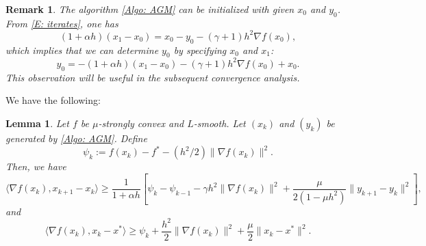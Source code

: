 \documentclass[pdflatex,sn-mathphys-num]{sn-jnl}
\theoremstyle{thmstyleone}
\newtheorem{lemma}[theorem]{Lemma}
\theoremstyle{thmstyletwo}
\newtheorem{remark}{Remark}
\theoremstyle{thmstylethree}
\begin{document}
\begin{remark}\label{Rem: x_0}
The algorithm \eqref{Algo: AGM} can be initialized with given $x_0$ and $y_0$. From \eqref{E: iterates}, one has  
$$ (1+\alpha h)(x_1-x_0) = x_0 - y_0 - (\gamma+1)h^2\nabla f(x_0), $$
which implies that we can determine $y_0$ by specifying $x_0$ and $x_1$:
$$ y_0 = -(1+\alpha h)(x_1-x_0) - (\gamma+1)h^2\nabla f(x_0) + x_0. $$
This observation will be useful in the subsequent convergence analysis. 
\end{remark}


We have the following:
\begin{lemma}\label{Lem: func_bound}
Let $f$ be $\mu$-strongly convex and $L$-smooth. Let $(x_k)$ and $(y_k)$ be generated by \eqref{Algo: AGM}. Define
\begin{equation}\label{E: psi_k}
\psi_k := f(x_k) - f^* - (h^2/2)\| \nabla f(x_k) \|^2.
\end{equation}
Then, we have
$$ \langle \nabla f(x_k), x_{k+1}-x_k \rangle 
\ge \frac{1}{1+\alpha h}\left[ \psi_k - \psi_{k-1} - \gamma h^2 \| \nabla f(x_k) \|^2 + \frac{\mu}{2(1-\mu h^2)}\| y_{k+1} - y_k \|^2 \right], $$
and
$$ \langle \nabla f(x_k), x_k - x^* \rangle 
\ge \psi_k + \frac{h^2}{2} \| \nabla f(x_k) \|^2 + \frac{\mu}{2}\| x_k-x^* \|^2. $$
\end{lemma}
\end{document}
